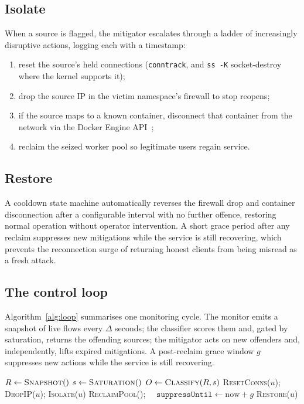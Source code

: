 \documentclass[conference]{IEEEtran}
\begin{document}
\subsection{Isolate}
When a source is flagged, the mitigator escalates through a ladder of
increasingly disruptive actions, logging each with a timestamp:
\begin{enumerate}
  \item reset the source's held connections (\texttt{conntrack}, and
  \texttt{ss -K} socket-destroy where the kernel supports it);
  \item drop the source IP in the victim namespace's firewall to stop reopens;
  \item if the source maps to a known container, disconnect that container from
  the network via the Docker Engine API~\cite{docker_engine_api};
  \item reclaim the seized worker pool so legitimate users regain service.
\end{enumerate}

\subsection{Restore}
A cooldown state machine automatically reverses the firewall drop and container
disconnection after a configurable interval with no further offence, restoring
normal operation without operator intervention. A short grace period after any
reclaim suppresses new mitigations while the service is still recovering, which
prevents the reconnection surge of returning honest clients from being
misread as a fresh attack.

\subsection{The control loop}
Algorithm~\ref{alg:loop} summarises one monitoring cycle. The monitor emits a
snapshot of live flows every $\Delta$ seconds; the classifier scores them and,
gated by saturation, returns the offending sources; the mitigator acts on new
offenders and, independently, lifts expired mitigations. A post-reclaim grace
window $g$ suppresses new actions while the service is still recovering.

\begin{algorithm}[t]
\caption{Closed-loop detection and mitigation (one cycle)}
\label{alg:loop}
\begin{algorithmic}[1]
\State $R \gets \textsc{Snapshot}()$ 
\State $s \gets \textsc{Saturation}()$ 
\State $O \gets \textsc{Classify}(R, s)$ 
    \State \textsc{ResetConns}($u$); \textsc{DropIP}($u$); \textsc{Isolate}($u$)
    \State \textsc{ReclaimPool}(); \ \ $\texttt{suppressUntil} \gets \text{now}+g$
  \EndFor
\EndIf
{}
  \State \textsc{Restore}($u$) 
\EndFor
\end{algorithmic}
\end{algorithm}
\end{document}
